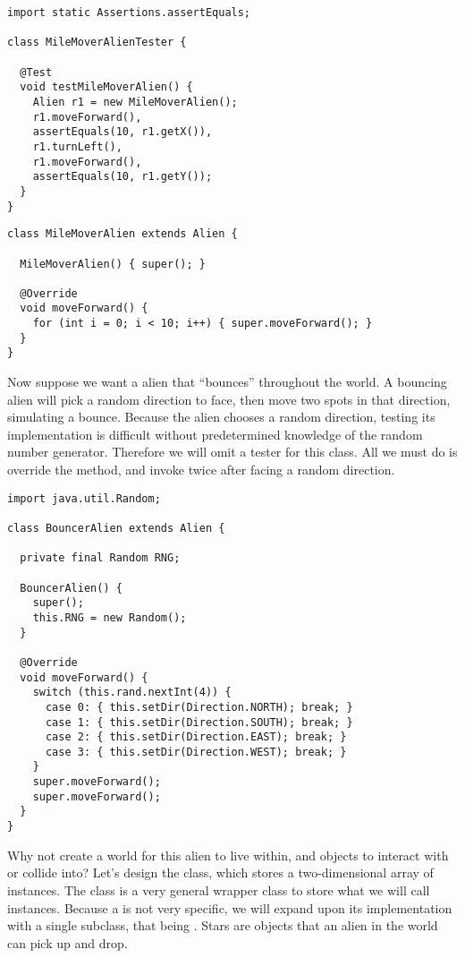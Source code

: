 \begin{lstlisting}[language=MyJava]
import static Assertions.assertEquals;

class MileMoverAlienTester {

  @Test
  void testMileMoverAlien() {
    Alien r1 = new MileMoverAlien();
    r1.moveForward(),
    assertEquals(10, r1.getX()),
    r1.turnLeft(),
    r1.moveForward(),
    assertEquals(10, r1.getY());
  }
}
\end{lstlisting}

\enlargethispage{4\baselineskip}
\begin{lstlisting}[language=MyJava]
class MileMoverAlien extends Alien {

  MileMoverAlien() { super(); }

  @Override
  void moveForward() {
    for (int i = 0; i < 10; i++) { super.moveForward(); }
  }
}
\end{lstlisting}

Now suppose we want a alien that ``bounces'' throughout the world. A bouncing alien will pick a random direction to face, then move two spots in that direction, simulating a bounce. Because the alien chooses a random direction, testing its implementation is difficult without predetermined knowledge of the random number generator. Therefore we will omit a tester for this class. All we must do is override the  method, and invoke  twice after facing a random direction.

\begin{lstlisting}[language=MyJava]
import java.util.Random;

class BouncerAlien extends Alien {

  private final Random RNG;

  BouncerAlien() {
    super();
    this.RNG = new Random();
  }

  @Override
  void moveForward() {
    switch (this.rand.nextInt(4)) {
      case 0: { this.setDir(Direction.NORTH); break; }
      case 1: { this.setDir(Direction.SOUTH); break; }
      case 2: { this.setDir(Direction.EAST); break; }
      case 3: { this.setDir(Direction.WEST); break; }
    }
    super.moveForward();
    super.moveForward();
  }
}
\end{lstlisting}

Why not create a world for this alien to live within, and objects to interact with or collide into? Let's design the  class, which stores a two-dimensional array of  instances. The  class is a very general wrapper class to store what we will call  instances. Because a  is not very specific, we will expand upon its implementation with a single subclass, that being . Stars are objects that an alien in the world can pick up and drop. 


